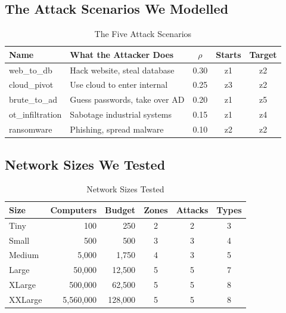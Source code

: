 \documentclass[journal]{IEEEtran}
\begin{document}
\subsection{The Attack Scenarios We Modelled}

\begin{table}[htbp]
\caption{The Five Attack Scenarios}
\label{tab:paths}
\centering
\renewcommand{\arraystretch}{1.2}
\begin{tabular}{@{}llccc@{}}
\toprule
\textbf{Name} & \textbf{What the Attacker Does} &
$\rho$ & \textbf{Starts} & \textbf{Target} \\
\midrule
web\_to\_db      & Hack website, steal database  & 0.30 & z1 & z2 \\
cloud\_pivot     & Use cloud to enter internal   & 0.25 & z3 & z2 \\
brute\_to\_ad    & Guess passwords, take over AD & 0.20 & z1 & z5 \\
ot\_infiltration & Sabotage industrial systems   & 0.15 & z1 & z4 \\
ransomware       & Phishing, spread malware      & 0.10 & z2 & z2 \\
\bottomrule
\end{tabular}
\end{table}

\subsection{Network Sizes We Tested}

\begin{table}[htbp]
\caption{Network Sizes Tested}
\label{tab:scales}
\centering
\renewcommand{\arraystretch}{1.2}
\begin{tabular}{@{}lrrccc@{}}
\toprule
\textbf{Size} & \textbf{Computers} & \textbf{Budget} &
\textbf{Zones} & \textbf{Attacks} & \textbf{Types} \\
\midrule
Tiny    &         100 &     250 & 2 & 2 & 3 \\
Small   &         500 &     500 & 3 & 3 & 4 \\
Medium  &       5,000 &   1,750 & 4 & 3 & 5 \\
Large   &      50,000 &  12,500 & 5 & 5 & 7 \\
XLarge  &     500,000 &  62,500 & 5 & 5 & 8 \\
XXLarge &   5,560,000 & 128,000 & 5 & 5 & 8 \\
\bottomrule
\end{tabular}
\end{table}
\end{document}

